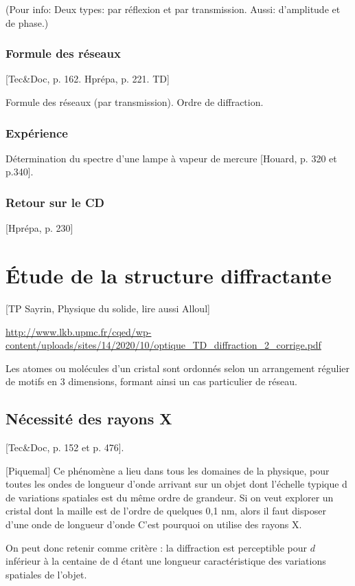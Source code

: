 \documentclass[11pt]{report}
\numberwithin{figure}{section}
\numberwithin{equation}{section}
\numberwithin{table}{section}
\newcommand{\1}{\boldsymbol{1}}
\begin{document}
(Pour info: Deux types: par réflexion et par transmission. Aussi: d'amplitude et de phase.)


\subsubsection{Formule des réseaux}

[Tec\&Doc, p. 162. Hprépa, p. 221. TD]

Formule des réseaux (par transmission). Ordre de diffraction.


\subsubsection{Expérience} 
Détermination du spectre d'une lampe à vapeur de mercure [Houard, p. 320 et p.340].

\subsubsection{Retour sur le CD}

[Hprépa, p. 230]


\section{Étude de la structure diffractante}

[TP Sayrin, Physique du solide, lire aussi Alloul]

\url{http://www.lkb.upmc.fr/cqed/wp-content/uploads/sites/14/2020/10/optique_TD_diffraction_2_corrige.pdf}

Les atomes ou molécules d'un cristal sont ordonnés selon un arrangement régulier de
motifs en 3 dimensions, formant ainsi un cas particulier de réseau.


\subsection{Nécessité des rayons X}

[Tec\&Doc, p. 152 et p. 476].

[Piquemal] Ce phénomène a lieu dans tous les domaines de la physique, pour toutes les ondes de longueur d’onde arrivant sur un objet dont l’échelle typique d de variations spatiales est du même ordre de grandeur. Si on veut explorer un cristal dont la maille est de l’ordre de quelques 0,1 nm, alors il faut disposer d’une onde de longueur d’onde C’est pourquoi on utilise des rayons X.

On peut donc retenir comme critère : la diffraction est perceptible pour $d$ inférieur à la centaine de d étant une longueur caractéristique des variations spatiales de l'objet.
\end{document}
